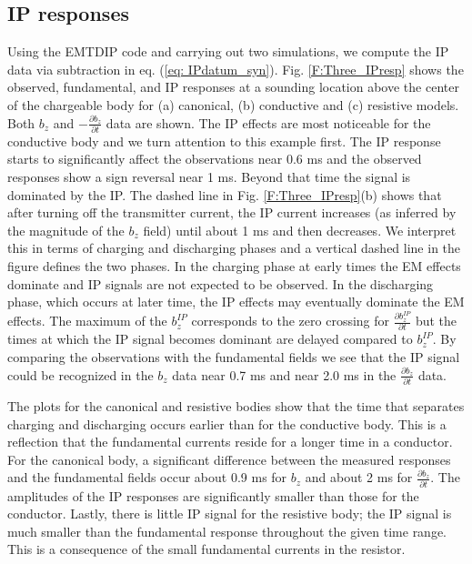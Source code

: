 \documentclass[extra,mreferee]{gji}
\begin{document}
\subsection{IP responses}
Using the  EMTDIP code and carrying out two simulations, we compute the IP data via subtraction in eq. (\ref{eq: IPdatum_syn}).
Fig. \ref{F:Three_IPresp} shows the observed, fundamental, and IP responses at a sounding location above the center of the chargeable body for (a) canonical, (b) conductive and (c) resistive models. Both $b_z$ and $-\frac{\partial b_z}{\partial t}$ data are shown. 
The IP effects are most noticeable for the conductive body and we turn attention to this example first. The IP response starts to significantly affect the observations near 0.6 ms and the observed responses show a sign reversal near 1 ms. Beyond that time the signal is dominated by the IP. The dashed line in Fig. \ref{F:Three_IPresp}(b) shows that after turning off the transmitter current, the IP current increases (as inferred by the magnitude of the $b_z$ field) until about 1 ms and then decreases. We interpret this in terms of charging and discharging phases and a vertical dashed line in the figure defines the two phases. In the charging phase at early times the EM effects dominate and IP signals are not expected to be observed. In the discharging phase, which occurs at  later time, the IP effects may eventually dominate the EM effects. The maximum of the $b_z^{IP}$ corresponds to the zero crossing for $\frac{\partial b_z^{IP}}{\partial t}$ but the times at which the IP signal becomes dominant are delayed compared to $b_z^{IP}$. By comparing the observations with the fundamental fields we see that the IP signal could be recognized in the $b_z$ data near 0.7 ms and near 2.0 ms in the $\frac{\partial b_z}{\partial t}$ data.

The plots for the canonical and resistive bodies show that the time that separates charging and discharging occurs earlier than for the conductive body. This is a reflection that the fundamental currents reside for a longer time in a conductor. For the canonical body, a significant difference between the measured responses and the fundamental fields occur about 0.9 ms for $b_z$ and about 2 ms for $\frac{\partial b_z}{\partial t}$. The amplitudes of the IP responses are significantly smaller than those for the conductor.  Lastly, there is little IP signal for the resistive body; the IP signal is much smaller than the fundamental response throughout the given time range. This is a consequence of the small fundamental currents in the resistor. 
\end{document}
